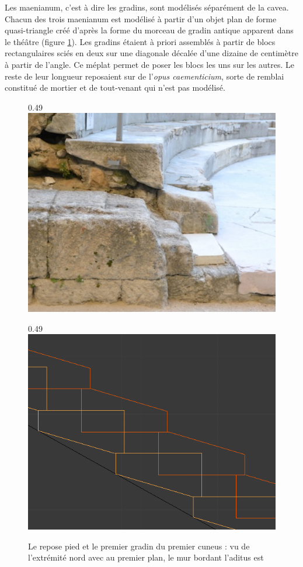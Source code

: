 Les maenianum, c'est à dire les gradins, sont modélisés séparément de la cavea. Chacun des trois maenianum est modélisé à partir d'un objet plan de forme quasi-triangle créé d'après la forme du morceau de gradin antique apparent dans le théâtre (figure \ref{coupeGradin}). Les gradins étaient à priori assemblés à partir de blocs rectangulaires sciés en deux sur une diagonale décalée d'une dizaine de centimètre à partir de l'angle. Ce méplat permet de poser les blocs les uns sur les autres. Le reste de leur longueur reposaient sur de l'\textit{opus caementicium}, sorte de remblai constitué de mortier et de tout-venant qui n'est pas modélisé. 

\begin{figure}[!h] 
	\begin{subfigureth}{0.49\textwidth}
		\includegraphics[scale=0.3]{images/gradinCoupe}
		\caption[Repose pied et premier gradin du premier \gls{cuneus}]{Le repose pied et le premier gradin du premier \gls{cuneus} : vu de l'extrémité nord avec au premier plan, le mur bordant l'\gls{aditus} est} 
		\label{coupeGradin} 		
	\end{subfigureth}	
	\begin{subfigureth}{0.49\textwidth}
		\includegraphics[scale=0.3]{images/escaliers}

\end{subfigureth}
\end{figure}
